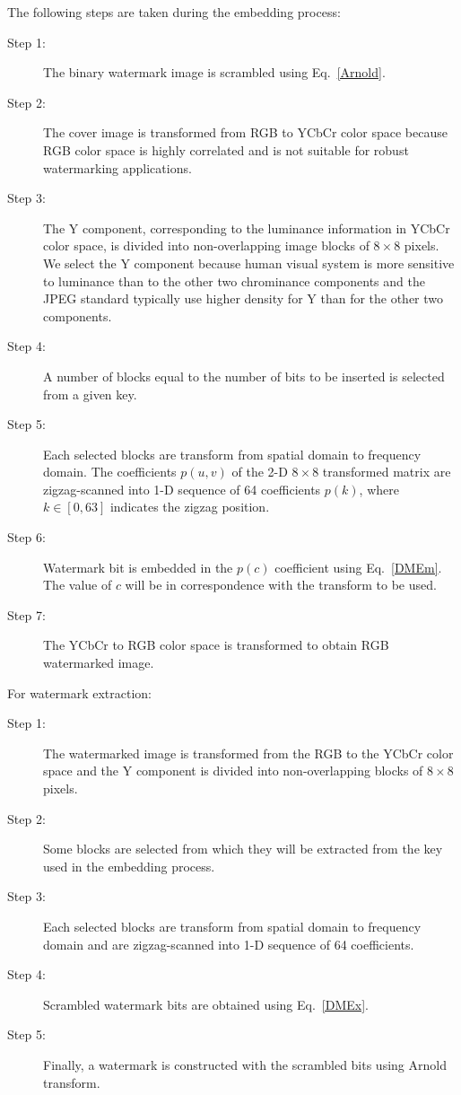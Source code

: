 \documentclass[runningheads]{llncs}
\begin{document}
The following steps are taken during the embedding process:
\begin{description}
	\item[Step 1:] The binary watermark image is scrambled using Eq.~\ref{Arnold}.
	\item[Step 2:] The cover image is transformed from RGB to YCbCr color space because RGB color space is highly correlated and is not suitable for robust watermarking applications.
	\item[Step 3:] The Y component, corresponding to the luminance information in YCbCr color space, is divided into non-overlapping image blocks of $8\times 8$ pixels. We select the Y component because human visual system is more sensitive to luminance than to the other two chrominance components and the JPEG standard typically use higher density for Y than for the other two components.
	\item[Step 4:] A number of blocks equal to the number of bits to be inserted is selected from a given key.
	\item[Step 5:] Each selected blocks are transform from spatial domain to frequency domain. The coefficients $p(u,v)$ of the 2-D $8\times 8$ transformed matrix are zigzag-scanned into 1-D sequence of 64 coefficients $p(k)$, where $k\in[0,63]$ indicates the zigzag position.
	\item[Step 6:] Watermark bit is embedded in the $p(c)$ coefficient using Eq.~\ref{DMEm}. The value of $c$ will be in correspondence with the transform to be used. 
	\item[Step 7:] The YCbCr to RGB color space is transformed to obtain RGB watermarked image.
\end{description}

For watermark extraction:
\begin{description}
	\item[Step 1:] The watermarked image is transformed from the RGB to the YCbCr color space and the Y component is divided into non-overlapping blocks of $8\times 8$ pixels.
	\item[Step 2:] Some blocks are selected from which they will be extracted from the key used in the embedding process.
	\item[Step 3:] Each selected blocks are transform from spatial domain to frequency domain and are	zigzag-scanned into 1-D sequence of 64 coefficients.
	\item[Step 4:] Scrambled watermark bits are obtained using Eq.~\ref{DMEx}.
	\item[Step 5:] Finally, a watermark is constructed with the scrambled bits using Arnold transform.
\end{description}
\end{document}
